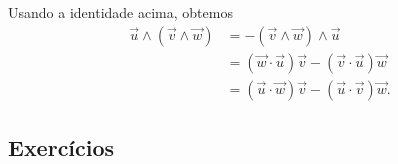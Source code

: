 Usando a identidade acima, obtemos
\begin{align}
  \vec{u}\land(\vec{v}\land\vec{w}) &= -(\vec{v}\land\vec{w})\land\vec{u}\\
                                   &= (\vec{w}\cdot\vec{u})\vec{v}-(\vec{v}\cdot\vec{u})\vec{w}\\
                                   &=(\vec{u}\cdot\vec{w})\vec{v}-(\vec{u}\cdot\vec{v})\vec{w}.
\end{align}

\subsection*{Exercícios}

\emconstrucao